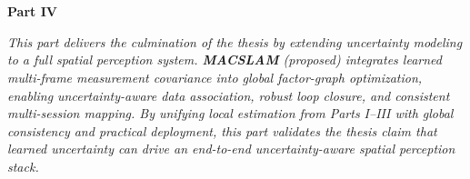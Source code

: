 \chapter*{} %
\begin{center}
    \vspace*{3.5cm} 
{\Huge \textbf{Part IV} \\ [1cm]}
{\LARGE \textbf{\partIVTitle}}
\end{center}

\vspace{2cm}

\begin{center}
\textit{This part delivers the culmination of the thesis by extending uncertainty modeling to a full spatial perception system. \textbf{MACSLAM} (proposed) integrates learned multi-frame measurement covariance into global factor-graph optimization, enabling uncertainty-aware data association, robust loop closure, and consistent multi-session mapping. By unifying local estimation from Parts I--III with global consistency and practical deployment, this part validates the thesis claim that learned uncertainty can drive an end-to-end uncertainty-aware spatial perception stack.}
\end{center}
